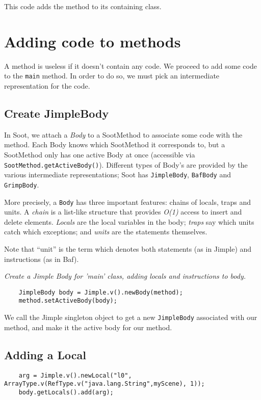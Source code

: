 \documentclass{article}
\begin{document}
This code adds the method to its containing class.

\section{Adding code to methods}

A method is useless if it doesn't contain any code.  We proceed to add some
code to the {\tt main} method.  In order to do so, we must pick an intermediate
representation for the code.

\subsection{Create JimpleBody}

In Soot, we attach a {\em Body} to a SootMethod to associate some code with
the method.  Each Body knows which SootMethod it corresponds to, but a SootMethod
only has one active Body at once (accessible via {\tt SootMethod.getActiveBody()}).
Different types of Body's are provided by the various intermediate representations;
Soot has {\tt JimpleBody}, {\tt BafBody} and {\tt GrimpBody}.

More precisely, a {\tt Body} has three important features: chains of
locals, traps and units.  A {\em chain} is a list-like structure that
provides {\em O(1)} access to insert and delete elements.  {\em Locals}
are the local variables in the body; {\em traps} say which units catch
which exceptions; and {\em units} are the statements themselves.

Note that ``unit'' is the term which denotes both statements (as in Jimple)
and instructions (as in Baf).

{\em Create a Jimple Body for 'main' class, adding locals and instructions to body.}

\begin{verbatim}
    JimpleBody body = Jimple.v().newBody(method);
    method.setActiveBody(body);
\end{verbatim}

We call the Jimple singleton object to get a new {\tt JimpleBody} associated
with our method, and make it the active body for our method.

\subsection{Adding a Local}

\begin{verbatim}
    arg = Jimple.v().newLocal("l0", ArrayType.v(RefType.v("java.lang.String",myScene), 1));
    body.getLocals().add(arg);
\end{verbatim}
\end{document}
